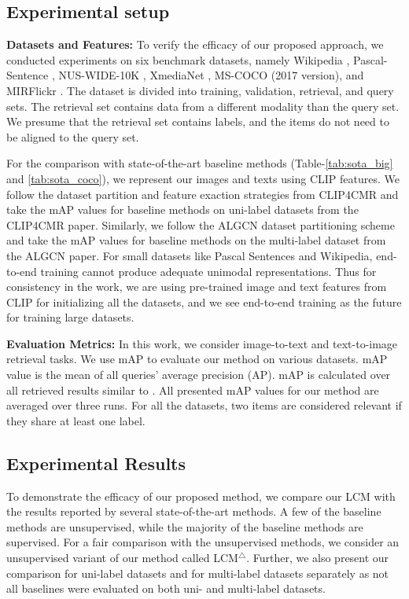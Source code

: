 \subsection{Experimental setup}
\noindent\textbf{Datasets and Features:}
To verify the efficacy of our proposed approach, we conducted experiments on six benchmark datasets, namely Wikipedia \cite{wiki}, Pascal-Sentence \cite{pascal}, NUS-WIDE-10K \cite{nuswide}, XmediaNet \cite{Peng2018AnOO, xmedianet}, MS-COCO \cite{mscoco} (2017 version), and MIRFlickr \cite{mirflickr25k}. The dataset is divided into training, validation, retrieval, and query sets. The retrieval set contains data from a different modality than the query set. We presume that the retrieval set contains labels, and the items do not need to be aligned to the query set. 
\par For the comparison with state-of-the-art baseline methods (Table-\ref{tab:sota_big} and \ref{tab:sota_coco}), we represent our images and texts using CLIP features. We follow the dataset partition and feature exaction strategies from CLIP4CMR \cite{clip4cmr} and take the mAP values for baseline methods on uni-label datasets from the CLIP4CMR \cite{clip4cmr} paper. Similarly, we follow the ALGCN \cite{algcn} dataset partitioning scheme and take the mAP values for baseline methods on the multi-label dataset from the ALGCN \cite{algcn} paper. For small datasets like Pascal Sentences and Wikipedia, end-to-end training cannot produce adequate unimodal representations. Thus for consistency in the work, we are using pre-trained image and text features from CLIP for initializing all the datasets, and we see end-to-end training as the future for training large datasets.

\noindent\textbf{Evaluation Metrics:}
In this work, we consider image-to-text and text-to-image retrieval tasks. We use mAP to evaluate our method on various datasets. mAP value is the mean of all queries' average precision (AP). mAP is calculated over all retrieved results similar to \cite{dscmr, pan, clip4cmr}. All presented mAP values for our method are averaged over three runs. For all the datasets, two items are considered relevant if they share at least one label.

\subsection{Experimental Results}
To demonstrate the efficacy of our proposed method, we compare our LCM with the results reported by several state-of-the-art methods. A few of the baseline methods are unsupervised, while the majority of the baseline methods are supervised. For a fair comparison with the unsupervised methods, we consider an unsupervised variant of our method called LCM$^\triangle$. Further, we also present our comparison for uni-label datasets and for multi-label datasets separately as not all baselines were evaluated on both uni- and multi-label datasets. 


